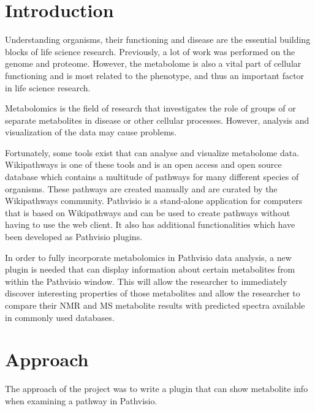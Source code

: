 \documentclass{bioinfo}
\begin{document}
\section{Introduction}
Understanding organisms, their functioning and disease are the essential building blocks of life science research. Previously, a lot of work was performed on the genome and proteome. However, the metabolome is also a vital part of cellular functioning and is most related to the phenotype, and thus an important factor in life science research.

Metabolomics is the field of research that investigates the role of groups of or separate metabolites in disease or other cellular processes. However, analysis and visualization of the data may cause problems.

Fortunately, some tools exist that can analyse and visualize metabolome data. Wikipathways is one of these tools and is an open access and open source database which contains a multitude of pathways for many different species of organisms. These pathways are created manually and are curated by the Wikipathways community. \cite{kelder} Pathvisio \cite{iersel} is a stand-alone application for computers that is based on Wikipathways and can be used to create pathways without having to use the web client. It also has additional functionalities which have been developed as Pathvisio plugins.

In order to fully incorporate metabolomics in Pathvisio data analysis, a new plugin is needed that can display information about certain metabolites from within the Pathvisio window. This will allow the researcher to immediately discover interesting properties of those metabolites and allow the researcher to compare their NMR and MS metabolite results with predicted spectra available in commonly used databases.

\section{Approach}
The approach of the project was to write a plugin that can show metabolite info when examining a pathway in Pathvisio.
\end{document}
